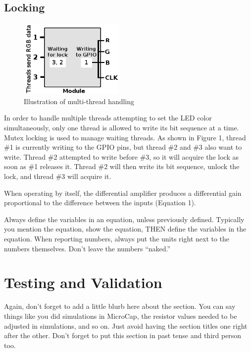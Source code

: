 \documentclass[10pt]{article}
\begin{document}
\subsection{Locking}
\noindent
\begin{figure}
    \includegraphics[width=0.45\textwidth]{figure1}
  \caption{Illustration of multi-thread handling}
\end{figure}
\noindent In order to handle multiple threads attempting to set the LED color simultaneously, only one thread is allowed to write its bit sequence at a time. Mutex locking is used to manage waiting threads. As shown in Figure 1, thread \#1 is currently writing to the GPIO pins, but thread \#2 and \#3 also want to write. Thread \#2 attempted to write before \#3, so it will acquire the lock as soon as \#1 releases it. Thread \#2 will then write its bit sequence, unlock the lock, and thread \#3 will acquire it.

\noindent When operating by itself, the differential amplifier produces a differential gain proportional to the difference between the inputs (Equation 1).

\noindent Always define the variables in an equation, unless previously defined. Typically you mention the equation, show the equation, THEN define the variables in the equation. When reporting numbers, always put the units right next to the numbers themselves. Don’t leave the numbers “naked.”

\section{Testing and Validation}

\noindent Again, don’t forget to add a little blurb here about the section. You can say things like you did simulations in MicroCap, the resistor values needed to be adjusted in simulations, and so on. Just avoid having the section titles one right after the other. Don’t forget to put this section in past tense and third person too.
\end{document}

